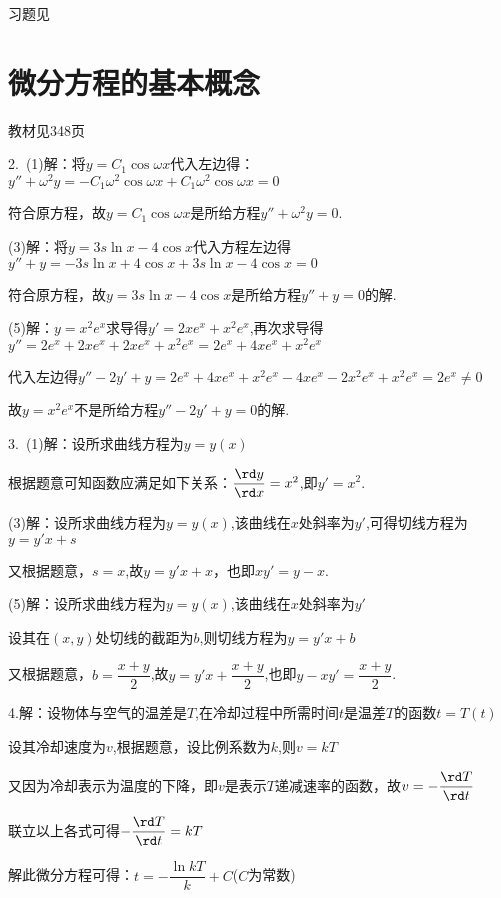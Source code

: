 \begin{flushright}
  \color{zhanqing!80}
   习题见
\end{flushright}
\section{微分方程的基本概念}
\begin{flushright}
  \color{zhanqing!80}
   教材见348页
\end{flushright}
  2.~(1)解：将$y=C_1 \cos \omega x$代入左边得：$y''+\omega ^2y=-C_1\omega ^2\cos \omega x+C_1\omega ^2\cos \omega x=0$

  符合原方程，故$y=C_1 \cos \omega x$是所给方程$y''+\omega ^2y=0$.

  (3)解：将$y=3s \ln x-4\cos x$代入方程左边得$y''+y=-3s \ln x+4\cos x+3s \ln x-4\cos x=0$

  符合原方程，故$y=3s \ln x-4\cos x$是所给方程$y''+y=0$的解.

  (5)解：$y=x^2e^x$求导得$y'=2xe^x+x^2e^x$,再次求导得$y''=2e^x+2xe^x+2xe^x+x^2e^x=2e^x+4xe^x+x^2e^x$

  代入左边得$y''-2y'+y=2e^x+4xe^x+x^2e^x-4xe^x-2x^2e^x+x^2e^x=2e^x \ne 0$

  故$y=x^2e^x$不是所给方程$y''-2y'+y=0$的解.

  3.~(1)解：设所求曲线方程为$y=y(x)$

  根据题意可知函数应满足如下关系：$\dfrac{{\rd y}}{{\rd x}}=x^2$,即$y'=x^2$.

  (3)解：设所求曲线方程为$y=y(x)$,该曲线在$x$处斜率为$y'$,可得切线方程为$y=y'x+s$

  又根据题意，$s=x$,故$y=y'x+x$，也即$xy'=y-x$.

  (5)解：设所求曲线方程为$y=y(x)$,该曲线在$x$处斜率为$y'$

  设其在$(x,y)$处切线的截距为$b$,则切线方程为$y=y'x+b$

  又根据题意，$b=\dfrac{x+y}{2}$,故$y=y'x+\dfrac{x+y}{2}$,也即$y-xy'=\dfrac{x+y}{2}$.

  4.解：设物体与空气的温差是$T$,在冷却过程中所需时间$t$是温差$T$的函数$t=T(t)$

  设其冷却速度为$v$,根据题意，设比例系数为$k$,则$v=kT$

  又因为冷却表示为温度的下降，即$v$是表示$T$递减速率的函数，故$v=-\dfrac{\rd T}{\rd t}$

  联立以上各式可得$-\dfrac{\rd T}{\rd t}=kT$

  解此微分方程可得：$t=-\dfrac{ \ln kT}{k}+C$($C$为常数)

